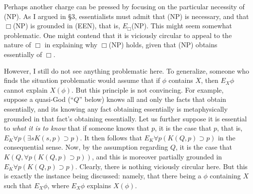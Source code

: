 \documentclass[12pt]{article}
\begin{document}
\par
Perhaps another charge can be pressed by focusing on the particular necessity of (NP). As I argued in \S 3, essentialists must admit that (NP) is necessary, and that $\Box$(NP) is grounded in (EEN), that is, $E_{\Box}$(NP). This might seem somewhat problematic. One might contend that it is viciously circular to appeal to the nature of $\Box$ in explaining why $\Box$(NP) holds, given that (NP) obtains essentially of $\Box$. 
\par
However, I still do not see anything problematic here. To generalize, someone who finds the situation problematic would assume that if $\phi$ contains $X$, then $E_X \phi$ cannot explain $X(\phi)$. But this principle is not convincing. For example, suppose a quasi-God (``$Q$'' below) knows all and only the facts that obtain essentially, and its knowing any fact obtaining essentially is metaphysically grounded in that fact's obtaining essentially. Let us further suppose it is essential to \textit{what it is to know} that if someone knows that $p$, it is the case that $p$, that is, $E_K \forall p (\exists s K(s, p) \supset p)$. It then follows that $E_K \forall p(K(Q, p) \supset p)$ in the consequential sense. Now, by the assumption regarding $Q$, it is the case that $K(Q, \forall p(K(Q, p) \supset p))$, and this is moreover partially grounded in $E_K \forall p(K(Q, p) \supset p)$. Clearly, there is nothing viciously circular here. But this is exactly the instance being discussed: namely, that there being a $\phi$ containing $X$ such that $E_X \phi$, where $E_X \phi$ explains $X(\phi)$. 
 
\end{document}
